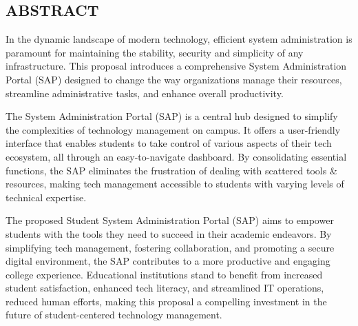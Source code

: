 \begin{center}
\section*{\textbf{ABSTRACT}}
\end{center}
In the dynamic landscape of modern technology, efficient system administration is paramount for maintaining the stability, security and simplicity of any infrastructure. This proposal introduces a comprehensive System Administration Portal (SAP) designed to change the way organizations manage their resources, streamline administrative tasks, and enhance overall productivity.

The System Administration Portal (SAP) is a central hub designed to simplify the complexities of technology management on campus. It offers a user-friendly interface that enables students to take control of various aspects of their tech ecosystem, all through an easy-to-navigate dashboard. By consolidating essential functions, the SAP eliminates the frustration of dealing with scattered tools & resources, making tech management accessible to students with varying levels of technical expertise.

The proposed Student System Administration Portal (SAP) aims to empower students with the tools they need to succeed in their academic endeavors. By simplifying tech management, fostering collaboration, and promoting a secure digital environment, the SAP contributes to a more productive and engaging college experience. Educational institutions stand to benefit from increased student satisfaction, enhanced tech literacy, and streamlined IT operations, reduced human efforts, making this proposal a compelling investment in the future of student-centered technology management.
